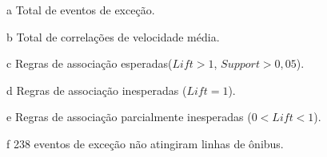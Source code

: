 \documentclass[
	12pt,				%
	oneside,			%
	a4paper,			%
	english,			%
	brazil				%
	]{abntex2ppgsi}
\begin{document}
{{{\begin{apendicesenv}
\begin{table}[!htb]
\begin{threeparttable}
\begin{tablenotes}
            \item[a] Total de eventos de exceção.
            \item[b] Total de correlações de velocidade média.
            \item[c] Regras de associação esperadas($Lift > 1$, $Support > 0,05$).
            \item[d] Regras de associação inesperadas ($Lift = 1$).
            \item[e] Regras de associação parcialmente inesperadas ($0 < Lift < 1$).
            \item[f] 238 eventos de exceção não atingiram linhas de ônibus.
        \end{tablenotes}
\end{threeparttable}
\end{table}



\end{apendicesenv}}}}
\end{document}
